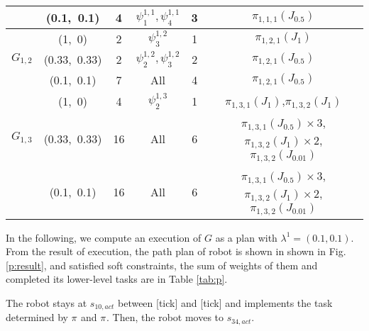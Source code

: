 \documentclass{article}
\newcommand{\rfig}[1]{Fig.\,\ref{#1}}
\newcommand{\tick}{{\sf tick}}
\begin{document}
{\begin{table}[h]
\begin{subfigmatrix}{2}
{\begin{tabular}{c|c|c|c|c|c}
			& (0.1,~0.1)	& 4 & $\psi^{1,1}_1,\psi^{1,1}_4$&3  & $\pi_{1,1,1}(J_{0.5})$ \\
\hline			
			& (1,~0)		& 2 & $\psi^{1,2}_3$&1 &$\pi_{1,2,1}(J_{1})$ \\
$G_{1,2}$ 	& (0.33,~0.33) 		& 2 & $\psi^{1,2}_2,\psi^{1,2}_3$&2  &$\pi_{1,2,1}(J_{0.5})$ \\
			& (0.1,~0.1)	& 7&All   &4  &$\pi_{1,2,1}(J_{0.5})$ \\
\hline	
			& (1,~0) 		& 4 & $\psi^{1,3}_2$ &1 &$\pi_{1,3,1}(J_{1})$,$\pi_{1,3,2}(J_{1})$\\
$G_{1,3}$ 	& (0.33,~0.33) 		& 16 &All&6  &$\pi_{1,3,1}(J_{0.5})\times 3$, $\pi_{1,3,2}(J_{1})\times 2$, $\pi_{1,3,2}(J_{0.01})$   \\
			& (0.1,~0.1) 	& 16&All  &6 &$\pi_{1,3,1}(J_{0.5})\times 3$, $\pi_{1,3,2}(J_{1})\times 2$, $\pi_{1,3,2}(J_{0.01})$  \\
\end{tabular}\label{tab:mw:bot}}
\end{subfigmatrix}
\end{table}
}
%
In the following, we compute an execution of $G$ as a plan with $\lambda^1=(0.1,0.1)$.
From the result of execution, the path plan of robot is shown in shown in \rfig{p:result}, and satisfied soft constraints, the sum of weights of them and completed its lower-level tasks are in Table \ref{tab:p}.


The robot stays at $s_{10,act}$ between [\tick] and [\tick] and implements the task determined by $\pi_{}$ and $\pi_{}$.
Then, the robot moves to $s_{34,act}$.
\end{document}
